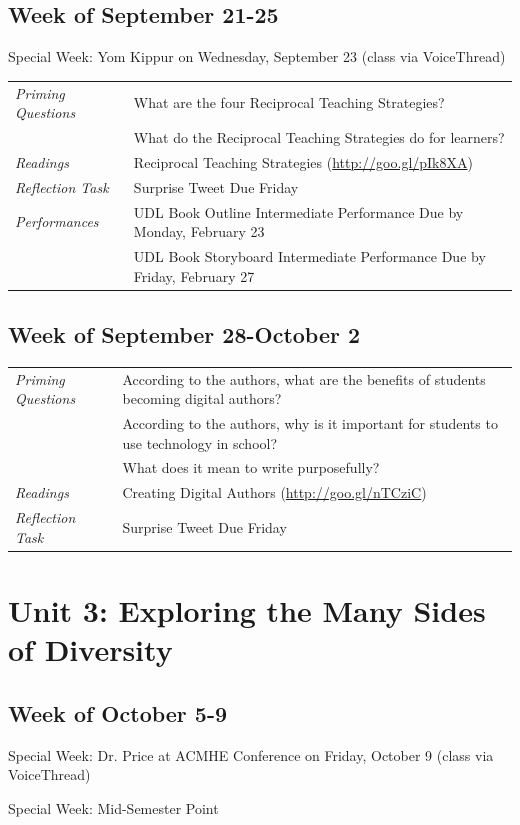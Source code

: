 \documentclass{tufte-handout}
\newcommand{\tabpq}{\faQuestionSign\medspace\textit{Priming Questions}}
\newcommand{\tabread}{\faBook\medspace\textit{Readings}}
\newcommand{\tabtweet}{\faLightbulb\medspace\textit{Reflection Task} & Surprise Tweet Due Friday \\}
\newcommand{\tabperformance}{\faTasks\medspace\textit{Performances}}
\newenvironment{tabsched}
	{\small
	\begin{tabular}{p{1.5in}p{5in}}
	\toprule}
	{\bottomrule
	\end{tabular}
	\normalsize}
\newenvironment{specweek}
	{\begin{center}
		\fontseries{b} \faBullhorn \medspace Special Week: }
		{\medspace \faBullhorn \fontseries{m}
	\end{center}}
\newcommand{\weeksix}{September 21-25}
\newcommand{\weekseven}{September 28-October 2}
\newcommand{\weekeight}{October 5-9}
\newcommand{\yomkippur}{Yom Kippur on Wednesday, September 23 (class via VoiceThread)}
\newcommand{\midsemester}{Mid-Semester Point}
\newcommand{\acmhe}{Dr. Price at ACMHE Conference on Friday, October 9 (class via VoiceThread)}
\begin{document}
\subsection{Week of \weeksix}

\begin{specweek}\yomkippur\end{specweek}

\begin{tabsched}
	\tabpq & What are the four Reciprocal Teaching Strategies? \\
	& What do the Reciprocal Teaching Strategies do for learners? \\
	\midrule
	\tabread & Reciprocal Teaching Strategies (\url{http://goo.gl/pIk8XA}) \\
	\midrule
	\tabtweet
	\midrule
	\tabperformance & UDL Book Outline Intermediate Performance Due by Monday, February 23 \\
	& UDL Book Storyboard Intermediate Performance Due by Friday, February 27 \\

\end{tabsched}

\subsection{Week of \weekseven}

\begin{tabsched}
	\tabpq & According to the authors, what are the benefits of students becoming digital authors? \\
	& According to the authors, why is it important for students to use technology in school? \\
	& What does it mean to write purposefully? \\
	\midrule
	\tabread & Creating Digital Authors (\url{http://goo.gl/nTCziC}) \\
	\midrule
	\tabtweet
\end{tabsched}

\section{Unit 3: Exploring the Many Sides of Diversity}

\subsection{Week of \weekeight}

\begin{specweek}\acmhe\end{specweek}
\begin{specweek}\midsemester\end{specweek}
\end{document}

